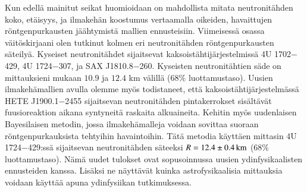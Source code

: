\begin{otherlanguage}{finnish}
Kun edellä mainitut seikat huomioidaan on mahdollista mitata neutronitähden koko, etäisyys, ja ilmakehän koostumus vertaamalla oikeiden, havaittujen rönt\-gen\-pur\-kaus\-ten jäähtymistä mallien ennusteisiin. 
Viimeisessä osassa väitöskirjaani olen tutkinut kolmen eri neutronitähden röntgenpurkausten säteilyä.
Kyseiset neutronitähdet sijaitsevat kaksois\-täh\-ti\-jär\-jes\-tel\-missä 4U 1702$-$429, 4U 1724$-$307, ja SAX J1810.8$-$260. 
Kyseisten neutronitähtien säde on mittauksieni mukaan $10.9$ ja $12.4$ km välillä ($68\%$ luottamustaso). 
Uusien ilmakehämallien avulla olemme myös todistaneet, että kaksois\-täh\-ti\-jär\-jes\-tel\-mässä HETE J1900.1$-$2455 sijaitsevan neutronitähden pintakerrokset sisältävät fuusioreaktion aikana syntyneitä raskaita alkuaineita. 
Kehitin myös uudenlaisen Bayesilaisen metodin, jossa ilmakehämalleja voidaan sovittaa suoraan röntgenpurkauksista tehtyihin havaintoihin. 
Tätä metodia käyttäen mittasin 4U 1724$-$429:ssä sijaitsevan neutronitähden sä\-teek\-si $R=12.4 \pm 0.4\, \mathrm{km}$ ($68\%$ luottamustaso). 
Nämä uudet tulokset ovat sopusoinnussa uusien ydinfysikaalisten ennusteiden kanssa. 
Lisäksi ne näyttävät kuinka astrofysikaalisia mittauksia voidaan käyttää apuna ydinfysiikan tutkimuksessa.

\end{otherlanguage}

